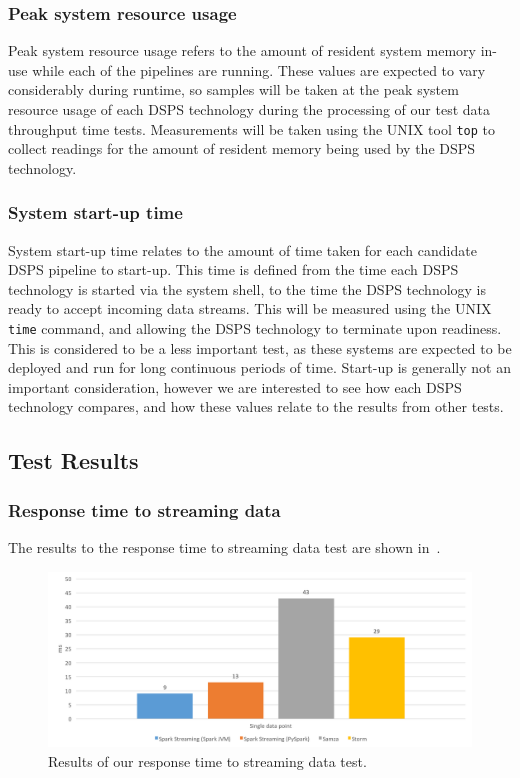 \subsubsection{Peak system resource usage}

Peak system resource usage refers to the amount of resident system memory in-use while each of the pipelines are running.
These values are expected to vary considerably during runtime, so samples will be taken at the peak system resource usage of each DSPS
technology during the processing of our test data throughput time tests.
Measurements will be taken using the UNIX tool \texttt{top} to collect readings for the amount of resident memory being used
by the DSPS technology.

\subsubsection{System start-up time}

System start-up time relates to the amount of time taken for each candidate DSPS pipeline to start-up. This time is
defined from the time each DSPS technology is started via the system shell, to the time the DSPS technology is
ready to accept incoming data streams. This will be measured using the UNIX \texttt{time} command, and allowing the
DSPS technology to terminate upon readiness. This is considered to be a less important test, as these systems are expected
to be deployed and run for long continuous periods of time. Start-up is generally not an important consideration, however
we are interested to see how each DSPS technology compares, and how these values relate to the results from other tests.



\subsection{Test Results} %
\label{sub:test_results}

\subsubsection{Response time to streaming data}

The results to the response time to streaming data test are shown in~.

\begin{figure}[H]
  \centering
  \includegraphics[width=1\textwidth]{includes/figures/fig_response_time_res}
  \caption{Results of our response time to streaming data test.}
  \label{fig:response_time_res}
\end{figure}

